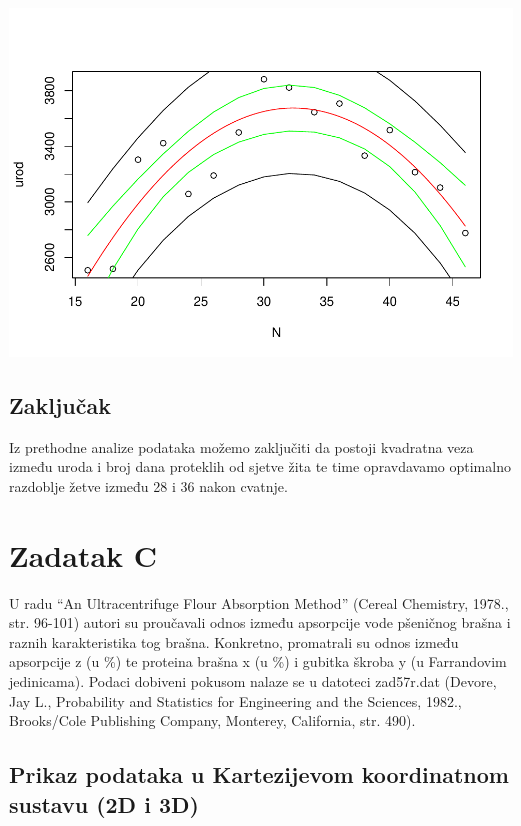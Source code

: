 \documentclass[]{article}
\begin{document}
\includegraphics{Izvjestaj_files/figure-latex/unnamed-chunk-23-1.pdf}

\subsection{Zaključak}\label{zakljucak}

Iz prethodne analize podataka možemo zaključiti da postoji kvadratna
veza između uroda i broj dana proteklih od sjetve žita te time
opravdavamo optimalno razdoblje žetve između 28 i 36 nakon cvatnje.

\section{Zadatak C}\label{zadatak-c}

U radu ``An Ultracentrifuge Flour Absorption Method'' (Cereal Chemistry,
1978., str. 96-101) autori su proučavali odnos između apsorpcije vode
pšeničnog brašna i raznih karakteristika tog brašna. Konkretno,
promatrali su odnos između apsorpcije z (u \%) te proteina brašna x (u
\%) i gubitka škroba y (u Farrandovim jedinicama). Podaci dobiveni
pokusom nalaze se u datoteci zad57r.dat (Devore, Jay L., Probability and
Statistics for Engineering and the Sciences, 1982., Brooks/Cole
Publishing Company, Monterey, California, str. 490).

\subsection{Prikaz podataka u Kartezijevom koordinatnom sustavu (2D i
3D)}\label{prikaz-podataka-u-kartezijevom-koordinatnom-sustavu-2d-i-3d}
\end{document}
